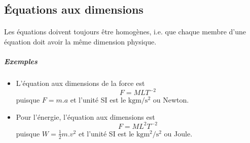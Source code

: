 \documentclass{article}
\begin{document}
        \subsection{Équations aux dimensions}
        \paragraph{}
        Les équations doivent toujours être homogènes, i.e.  que chaque membre d'une équation doit avoir la même dimension physique.

            \subparagraph{Exemples}
            \begin{itemize}
                \item L'équation aux dimensions de la force est
                \begin{equation*}
                    F = MLT^{-2}
                \end{equation*}
                puisque $F = m.a$ et l'unité SI est le $\si{\kilogram \meter \per \square \second}$ ou Newton.
                \item Pour l'énergie, l'équation aux dimensions est
                \begin{equation*}
                    F = ML^2T^{-2}
                \end{equation*}
                puisque $ W = \frac{1}{2}m.v^2$ et l'unité SI est le $\si{\kilogram \square \meter \per \square \second}$ ou Joule.
            \end{itemize}
\end{document}
